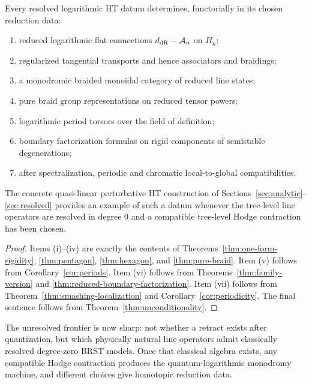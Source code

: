 \begin{theorem}\label{thm:platonic-ideal}
Every resolved logarithmic HT datum determines, functorially in its chosen reduction data:
\begin{enumerate}[label=\textup{(\roman*)}]
 \item reduced logarithmic flat connections $d_{\mathrm{dR}}-\mathcal A_n$ on $H_n$;
 \item regularized tangential transports and hence associators and braidings;
 \item a monodromic braided monoidal category of reduced line states;
 \item pure braid group representations on reduced tensor powers;
 \item logarithmic period torsors over the field of definition;
 \item boundary factorization formulas on rigid components of semistable degenerations;
 \item after spectralization, periodic and chromatic local-to-global compatibilities.
\end{enumerate}
The concrete quasi-linear perturbative HT construction of Sections~\ref{sec:analytic}--\ref{sec:resolved} provides an example of such a datum whenever the tree-level line operators are resolved in degree $0$ and a compatible tree-level Hodge contraction has been chosen.
\end{theorem}

\begin{proof}
Items (i)--(iv) are exactly the contents of Theorems~\ref{thm:one-form-rigidity}, \ref{thm:pentagon}, \ref{thm:hexagon}, and \ref{thm:pure-braid}. Item (v) follows from Corollary~\ref{cor:periods}. Item (vi) follows from Theorems~\ref{thm:family-version} and \ref{thm:reduced-boundary-factorization}. Item (vii) follows from Theorem~\ref{thm:smashing-localization} and Corollary~\ref{cor:periodicity}. The final sentence follows from Theorem~\ref{thm:unconditionality}.
\end{proof}

\begin{remark}
The unresolved frontier is now sharp: not whether a retract exists after quantization, but which physically natural line operators admit classically resolved degree-zero BRST models. Once that classical algebra exists, any compatible Hodge contraction produces the quantum-logarithmic monodromy machine, and different choices give homotopic reduction data.
\end{remark}

